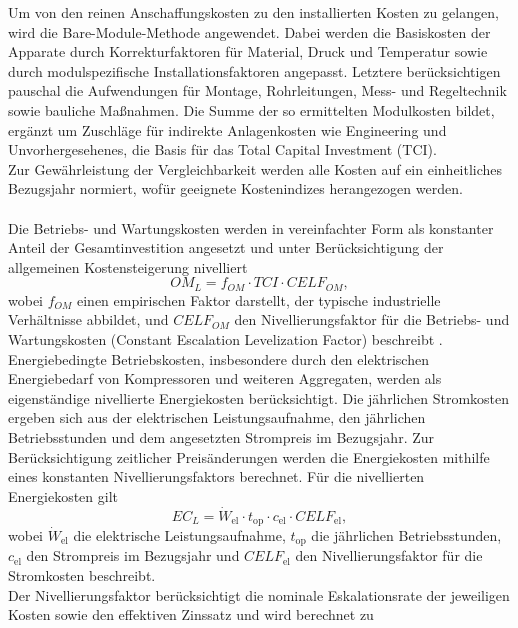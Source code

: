 Um von den reinen Anschaffungskosten zu den installierten Kosten zu gelangen, wird die Bare-Module-Methode angewendet. Dabei werden die Basiskosten der Apparate durch Korrekturfaktoren für Material, Druck und Temperatur sowie durch modulspezifische Installationsfaktoren angepasst. Letztere berücksichtigen pauschal die Aufwendungen für Montage, Rohrleitungen, Mess- und Regeltechnik sowie bauliche Maßnahmen. Die Summe der so ermittelten Modulkosten bildet, ergänzt um Zuschläge für indirekte Anlagenkosten wie Engineering und Unvorhergesehenes, die Basis für das Total Capital Investment (TCI).\\
Zur Gewährleistung der Vergleichbarkeit werden alle Kosten auf ein einheitliches Bezugsjahr normiert, wofür geeignete Kostenindizes herangezogen werden. \\
\\
Die Betriebs- und Wartungskosten werden in vereinfachter Form als konstanter Anteil der Gesamtinvestition angesetzt und unter Berücksichtigung der allgemeinen Kostensteigerung nivelliert
\begin{equation}
OM_L = f_{OM} \cdot TCI \cdot CELF_{OM},
\end{equation}
wobei $f_{OM}$ einen empirischen Faktor darstellt, der typische industrielle Verhältnisse abbildet, und $CELF_{OM}$ den Nivellierungsfaktor für die Betriebs- und Wartungskosten (Constant Escalation Levelization Factor) beschreibt \cite{bejanThermalDesignOptimization1996}.\\
Energiebedingte Betriebskosten, insbesondere durch den elektrischen Energiebedarf von Kompressoren und weiteren Aggregaten, werden als eigenständige nivellierte Energiekosten berücksichtigt. Die jährlichen Stromkosten ergeben sich aus der elektrischen Leistungsaufnahme, den jährlichen Betriebsstunden und dem angesetzten Strompreis im Bezugsjahr. Zur Berücksichtigung zeitlicher Preisänderungen werden die Energiekosten mithilfe eines konstanten Nivellierungsfaktors berechnet. Für die nivellierten Energiekosten gilt
\begin{equation}
EC_L = \dot{W}_\mathrm{el} \cdot t_\mathrm{op} \cdot c_\mathrm{el} \cdot CELF_\mathrm{el},
\end{equation}
wobei $\dot{W}_\mathrm{el}$ die elektrische Leistungsaufnahme, $t_\mathrm{op}$ die jährlichen Betriebsstunden, $c_\mathrm{el}$ den Strompreis im Bezugsjahr und $CELF_\mathrm{el}$ den Nivellierungsfaktor für die Stromkosten beschreibt.\\
Der Nivellierungsfaktor berücksichtigt die nominale Eskalationsrate der jeweiligen Kosten sowie den effektiven Zinssatz und wird berechnet zu
